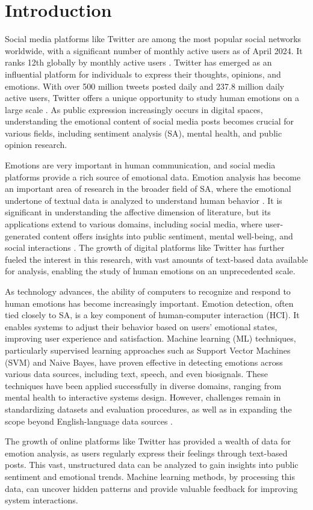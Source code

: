 

\section{Introduction}

Social media platforms like Twitter are among the most popular social networks worldwide, with a significant number of monthly active users as of April 2024. It ranks 12th globally by monthly active users \cite{statistica2023}. Twitter has emerged as an influential platform for individuals to express their thoughts, opinions, and emotions. With over 500 million tweets posted daily and 237.8 million daily active users, Twitter offers a unique opportunity to study human emotions on a large scale \cite{internetlivestats2023}\cite{twitterstats2023}. As public expression increasingly occurs in digital spaces, understanding the emotional content of social media posts becomes crucial for various fields, including sentiment analysis (SA), mental health, and public opinion research.

Emotions are very important in human communication, and social media platforms provide a rich source of emotional data. Emotion analysis has become an important area of research in the broader field of SA, where the emotional undertone of textual data is analyzed to understand human behavior \cite{Kim2019}. It is significant in understanding the affective dimension of literature, but its applications extend to various domains, including social media, where user-generated content offers insights into public sentiment, mental well-being, and social interactions \cite{Hakak2017}. The growth of digital platforms like Twitter has further fueled the interest in this research, with vast amounts of text-based data available for analysis, enabling the study of human emotions on an unprecedented scale.

As technology advances, the ability of computers to recognize and respond to human emotions has become increasingly important. Emotion detection, often tied closely to SA, is a key component of human-computer interaction (HCI). It enables systems to adjust their behavior based on users' emotional states, improving user experience and satisfaction. Machine learning (ML) techniques, particularly supervised learning approaches such as Support Vector Machines (SVM) and Naive Bayes, have proven effective in detecting emotions across various data sources, including text, speech, and even biosignals. These techniques have been applied successfully in diverse domains, ranging from mental health to interactive systems design. However, challenges remain in standardizing datasets and evaluation procedures, as well as in expanding the scope beyond English-language data sources \cite{Alslaity2022}.

The growth of online platforms like Twitter has provided a wealth of data for emotion analysis, as users regularly express their feelings through text-based posts. This vast, unstructured data can be analyzed to gain insights into public sentiment and emotional trends. Machine learning methods, by processing this data, can uncover hidden patterns and provide valuable feedback for improving system interactions. 
